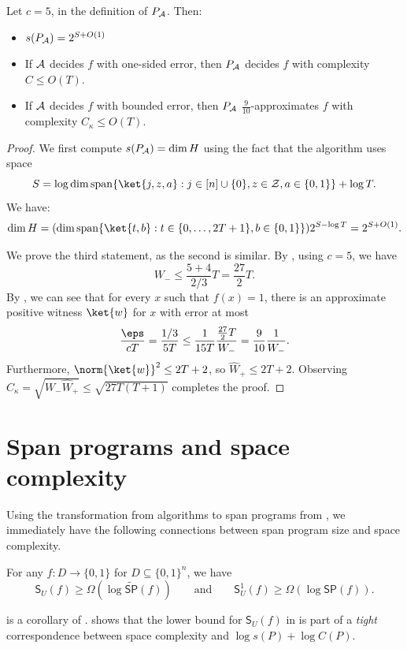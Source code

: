 \documentclass{toc}
\begin{document}
\begin{corollary}
Let $c=5$, in the definition of $P_{\cal A}$. Then:
\begin{itemize}
\item $s(P_{\cal A})=2^{S+O(1)}$
\item If $\cal A$ decides $f$ with one-sided error, then $P_{\cal A}$ decides $f$ with complexity $C\leq O(T)$.
\item If $\cal A$ decides $f$ with bounded error, then $P_{\cal A}$ $\frac{9}{10}$-approximates $f$ with complexity $C_\kappa\leq O(T)$.
\end{itemize}
\end{corollary}
\begin{proof}
We first compute $s(P_{\cal A})=\dim H$ using the fact that the algorithm uses space 
$$S=\log\dim\mathrm{span}\{\ket{j,z,a}:j\in [n]\cup\{0\},z\in{\cal Z},a\in\{0,1\}\}+\log T.$$
We have:
\begin{align*}
\dim H = (\dim\mathrm{span}\{\ket{t,b}:t\in\{0,\dots,2T+1\},b\in\{0,1\}\})2^{S-\log T}
 = 2^{S+O(1)}.
\end{align*}

We prove the third statement, as the second is similar. By , using $c=5$, we have 
$$W_-\leq \frac{5+4}{2/3}T = \frac{27}{2}T.$$
By , we can see that for every $x$ such that $f(x)=1$, there is an approximate positive witness $\ket{w}$ for $x$ with error 
at most %
$$\frac{\eps}{cT} = \frac{1/3}{5T}\leq \frac{1}{15T}\frac{\frac{27}{2}T}{W_-}=\frac{9}{10}\frac{1}{W_-}.$$
Furthermore, $\norm{\ket{w}}^2\leq 2T+2$, so $\widehat{W}_+\leq 2T+2$.
Observing
$C_{\kappa} = \sqrt{W_-\widehat{W}_+}\leq \sqrt{27T(T+1)}$ completes the proof.
\end{proof}

\section{Span programs and space complexity}\label{sec:span-space}

Using the transformation from  
algorithms to span programs from , we immediately have the following connections between span program size and space complexity.


\begin{theorem}\label{thm:span-space-lower-bound}
For any $f:D\rightarrow \{0,1\}$ for $D\subseteq \{0,1\}^n$, we have 
\begin{equation*}
\mathsf{S}_U(f)\geq \Omega\left(\log \widetilde{\mathsf{SP}}(f)\right) \qquad\mbox{and}\qquad \mathsf{S}_U^1(f)\geq \Omega\left(\log \mathsf{SP}(f)\right).
\end{equation*}
\end{theorem}
\noindent {} is a corollary of . 
 shows that the lower bound for $\mathsf{S}_U(f)$ in  is part of a \emph{tight} correspondence between space complexity and $\log s(P)+\log C(P)$. 
\end{document}
